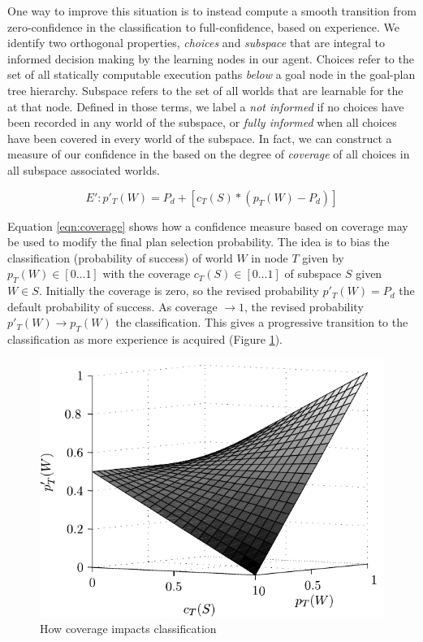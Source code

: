 One way to improve this situation is to instead compute a smooth transition from zero-confidence in the \dt classification to full-confidence, based on experience. We identify two orthogonal properties, \textit{choices} and \textit{subspace} that are integral to informed decision making by the learning nodes in our agent. Choices refer to the set of all statically computable execution paths \textit{below} a goal node in the goal-plan tree hierarchy. Subspace refers to the set of all worlds that are learnable for the \dt at that node. Defined in those terms, we label a \dt \textit{not informed} if no choices have been recorded in any world of the subspace, or \textit{fully informed} when all choices have been covered in every world of the subspace. In fact, we can construct a measure of our confidence in the \dt based on the degree of \textit{coverage} of all choices in all subspace associated worlds.

\begin{equation}
\label{eqn:coverage}   
E': p'_T(W)= P_d + \left[  c_T(S) *  \left( p_T(W) - P_d \right)  \right]
\end{equation}

Equation \ref{eqn:coverage} shows how a confidence measure based on coverage may be used to modify the final plan selection probability. The idea is to bias the \dt classification (probability of success) of world $W$ in node $T$ given by $p_T(W) \in [0 \ldots 1]$ with the coverage $c_T(S) \in [0 \ldots 1]$ of subspace $S$ given $W \in S$. Initially the coverage is zero, so the revised probability $p'_T(W) = P_d$ the default probability of success. As coverage $\rightarrow 1$, the revised probability $p'_T(W) \rightarrow p_T(W)$ the \dt classification. This gives a progressive transition to the \dt classification as more experience is acquired (Figure \ref{fig:coverage-surface}).

\begin{figure}[ht]
   \centering
   \includegraphics[width=\columnwidth]{figs/coverage-surface}
   \caption{How coverage impacts \dt classification}
   \label{fig:coverage-surface}
\end{figure}


